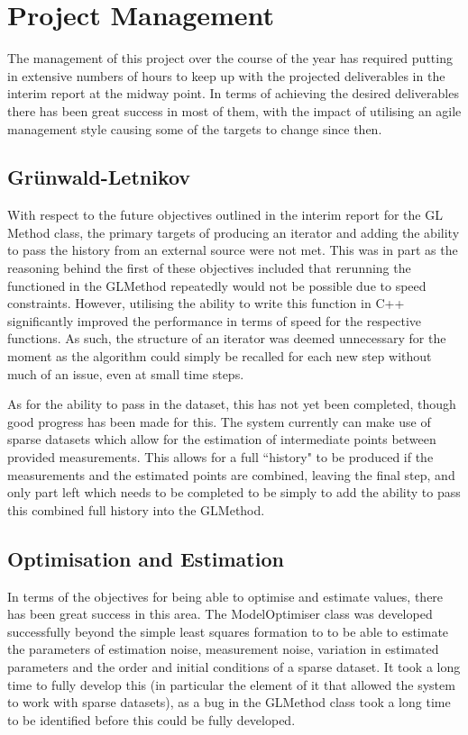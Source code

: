 \section{Project Management}

The management of this project over the course of the year has required putting in extensive numbers of hours to keep up with the projected deliverables in the interim report at the midway point. In terms of achieving the desired deliverables there has been great success in most of them, with the impact of utilising an agile management style causing some of the targets to change since then.

\subsection{Gr\"{u}nwald-Letnikov}

With respect to the future objectives outlined in the interim report for the GL Method class, the primary targets of producing an iterator and adding the ability to pass the history from an external source were not met. This was in part as the reasoning behind the first of these objectives included that rerunning the functioned in the GLMethod repeatedly would not be possible due to speed constraints. However, utilising the ability to write this function in C++ significantly improved the performance in terms of speed for the respective functions. As such, the structure of an iterator was deemed unnecessary for the moment as the algorithm could simply be recalled for each new step without much of an issue, even at small time steps.

As for the ability to pass in the dataset, this has not yet been completed, though good progress has been made for this. The system currently can make use of sparse datasets which allow for the estimation of intermediate points between provided measurements. This allows for a full ``history" to be produced if the measurements and the estimated points are combined, leaving the final step, and only part left which needs to be completed to be simply to add the ability to pass this combined full history into the GLMethod. 

\subsection{Optimisation and Estimation}

In terms of the objectives for being able to optimise and estimate values, there has been great success in this area. The ModelOptimiser class was developed successfully beyond the simple least squares formation to to be able to estimate the parameters of estimation noise, measurement noise, variation in estimated parameters and the order and initial conditions of a sparse dataset. It took a long time to fully develop this (in particular the element of it that allowed the system to work with sparse datasets), as a bug in the GLMethod class took a long time to be identified before this could be fully developed.


